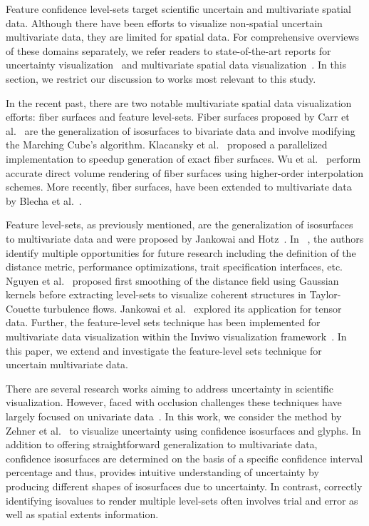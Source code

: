 Feature confidence level-sets target scientific uncertain and multivariate spatial data.
%
Although there have been efforts to visualize non-spatial uncertain multivariate data, they are limited for spatial data.
%
For comprehensive overviews of these domains separately, we refer readers to state-of-the-art reports for uncertainty visualization~\cite{Bonneau2014} and multivariate spatial data visualization~\cite{he2019multivariate}.
%
In this section, we restrict our discussion to works most relevant to this study.


In the recent past, there are two notable multivariate spatial data visualization efforts: fiber surfaces and feature level-sets.
%
Fiber surfaces proposed by Carr et al.~\cite{carr2015fiber} are the generalization of isosurfaces to bivariate data and involve modifying the Marching Cube's algorithm.
%
Klacansky et al.~\cite{klacansky2016fast} proposed a parallelized implementation to speedup generation of exact fiber surfaces.
%
Wu et al.~\cite{wu2016direct} perform accurate direct volume rendering of fiber surfaces using higher-order interpolation schemes.
%
More recently, fiber surfaces, have been extended to multivariate data by Blecha et al.~\cite{blecha2020fiber}.
%

Feature level-sets, as previously mentioned, are the generalization of isosurfaces to multivariate data and were proposed by Jankowai and Hotz~\cite{jankowai2020feature}.
%
In ~\cite{jankowai2020feature}, the authors identify multiple opportunities for future research including the definition of the distance metric, performance optimizations, trait specification interfaces, etc.
%
Nguyen et al.~\cite{nguyen2020visualization} proposed first smoothing of the distance field using Gaussian kernels before extracting level-sets to visualize coherent structures in Taylor-Couette turbulence flows.
%
Jankowai et al.~\cite{jankowai2020tensor} explored its application for tensor data. 
%
Further, the feature-level sets technique has been implemented for multivariate data visualization within the Inviwo visualization framework~\cite{jonsson2020inviwo}. 
%
In this paper, we extend and investigate the feature-level sets technique for uncertain multivariate data. 

There are several research works aiming to address uncertainty in scientific visualization.
%
However, faced with occlusion challenges these techniques have largely focused on univariate data~\cite{}.
%
In this work, we consider the method by Zehner et al.~\cite{zehner2010visualization} to visualize uncertainty using confidence isosurfaces and glyphs.
%
In addition to offering straightforward generalization to multivariate data, confidence isosurfaces are determined on the basis of a specific confidence interval percentage and thus, provides intuitive understanding of uncertainty by producing different shapes of isosurfaces due to uncertainty. 
%
In contrast, correctly identifying isovalues to render multiple level-sets often involves trial and error as well as spatial extents information. 

